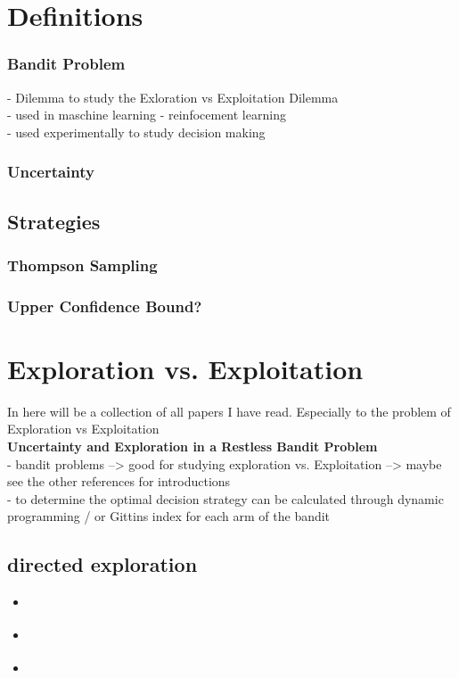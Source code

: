 \documentclass[main.tex]{subfiles}
\begin{document}
\section{Definitions}
\subsubsection*{Bandit Problem}
- Dilemma to study the Exloration vs Exploitation Dilemma \\
- used in maschine learning - reinfocement learning \\
- used experimentally to  study decision making
\subsubsection*{Uncertainty}
\subsection*{Strategies}
\subsubsection*{Thompson Sampling}
\subsubsection*{Upper Confidence Bound?}
\section{Exploration vs. Exploitation}
In here will be a collection of all papers I have read. Especially to the problem of Exploration vs Exploitation \\
\textbf{\cite{speekenbrink2015uncertainty} Uncertainty and Exploration in a Restless Bandit Problem \\}
- bandit problems --> good for studying exploration vs. Exploitation --> maybe see the other  references for introductions\\
- to determine the optimal decision strategy can  be calculated through dynamic programming / or Gittins index for each arm of the bandit\\


\subsection{directed exploration}
\begin{itemize}
\item \citep{auer2002finite}
\item \citep{gittins1979bandit}
\item \citet{gittins1974dynamic}
\end{itemize}
\end{document}
